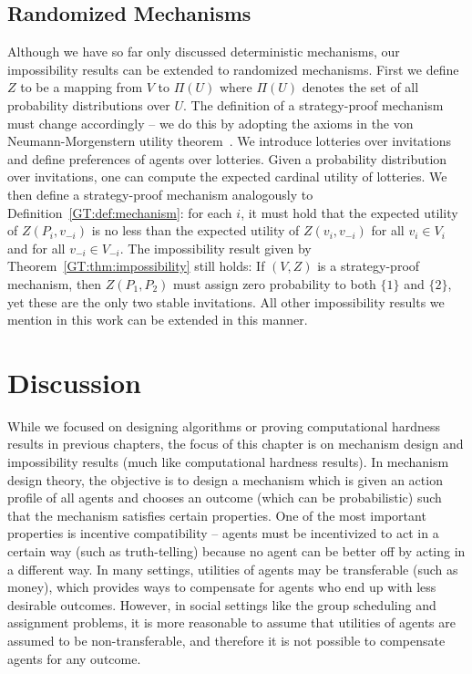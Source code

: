 \subsection{Randomized Mechanisms} \label{GT:sec:randomized}
Although we have so far only discussed deterministic mechanisms, our impossibility results can be extended to randomized mechanisms. First we define $Z$ to be a mapping from $V$ to $\Pi(U)$ where $\Pi(U)$ denotes the set of all probability distributions over $U$. The definition of a strategy-proof mechanism must change accordingly -- we do this by adopting the axioms in the von Neumann-Morgenstern utility theorem~\cite{von1947theory}. We introduce lotteries over invitations and define preferences of agents over lotteries. Given a probability distribution over invitations, one can compute the expected cardinal utility of lotteries. We then define a strategy-proof mechanism analogously to Definition~\ref{GT:def:mechanism}: for each $i$, it must hold that the expected utility of $Z(P_i, v_{-i})$ is no less than the expected utility of $Z(v_i, v_{-i})$ for all $v_i\in V_i$ and for all $v_{-i} \in V_{-i}$. The impossibility result given by Theorem~\ref{GT:thm:impossibility} still holds: If $(V, Z)$ is a strategy-proof mechanism, then $Z(P_1, P_2)$ must assign zero probability to both $\{1\}$ and $\{2\}$, yet these are the only two stable invitations.  All other impossibility results we mention in this work can be extended in this manner.



\section{Discussion}

While we focused on designing algorithms or proving computational hardness results in previous chapters, the focus of this chapter is on mechanism design and impossibility results (much like computational hardness results). In mechanism design theory, the objective is to design a mechanism which is given an action profile of all agents and chooses an outcome (which can be probabilistic) such that the mechanism satisfies certain properties. One of the most important properties is incentive compatibility -- agents must be incentivized to act in a certain way (such as truth-telling) because no agent can be better off by acting in a different way. In many settings, utilities of agents may be transferable (such as money), which provides ways to compensate for agents who end up with less desirable outcomes. However, in social settings like the group scheduling and assignment problems, it is more reasonable to assume that utilities of agents are assumed to be non-transferable, and therefore it is not possible to compensate agents for any outcome. 

